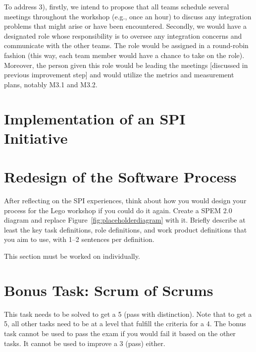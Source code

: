 \documentclass[conference]{IEEEtran}
\begin{document}
To address 3), firstly, we intend to propose that all teams schedule several
meetings throughout the workshop (e.g., once an hour) to discuss any
integration problems that might arise or have been encountered. Secondly, we
would have a designated role whose responsibility is to oversee any integration
concerns and communicate with the other teams. The role would be assigned in a
round-robin fashion (this way, each team member would have a chance to take on
the role). Moreover, the person given this role would be leading the meetings
[discussed in previous improvement step] and would utilize the metrics and
measurement plans, notably M3.1 and M3.2.

\section{Implementation of an SPI Initiative}
\label{sec:implementation}


\section{Redesign of the Software Process}
\label{sec:redesign}

After reflecting on the SPI experiences, think about how you would design your process for the Lego workshop if you could do it again.
Create a SPEM 2.0 diagram and replace Figure~\ref{fig:placeholderdiagram} with it.
Briefly describe at least the key task definitions, role definitions, and work product definitions that you aim to use, with 1--2 sentences per definition.

This section must be worked on individually.

\section{Bonus Task: Scrum of Scrums}
\label{sec:bonus_task}

This task needs to be solved to get a 5 (pass with distinction).
Note that to get a 5, all other tasks need to be at a level that fulfill the criteria for a 4.
The bonus task cannot be used to pass the exam if you would fail it based on the other tasks.
It cannot be used to improve a 3 (pass) either.
\end{document}
